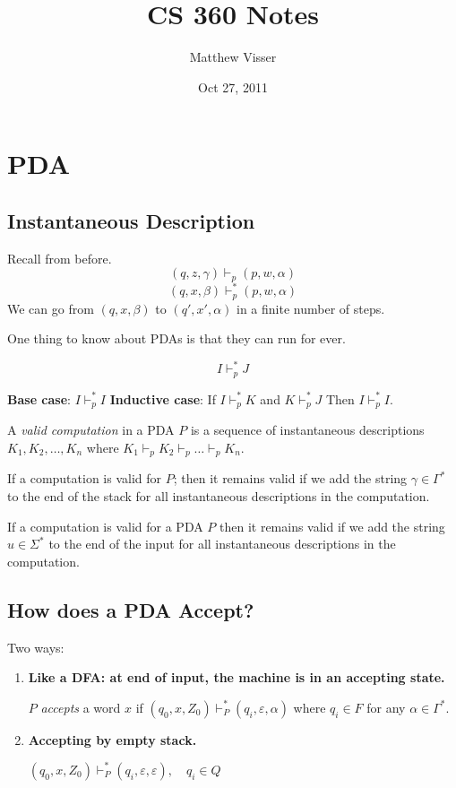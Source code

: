 \documentclass[12pt]{article}
\begin{document}
\title{CS 360 Notes}
\author{Matthew Visser}
\date{Oct 27, 2011}
\maketitle

\section{PDA}

\subsection{Instantaneous Description}

Recall from before.
\[
(q,z,\gamma) \vdash_p (p,w,\alpha)
\]
\[
(q,x,\beta) \vdash_p^* (p,w,\alpha)
\]
We can go from $(q,x,\beta)$ to $(q',x',\alpha)$ in a finite number of steps.

One thing to know about PDAs is that they can run for ever.

\[
I \vdash_p^* J
\]

\textbf{Base case}:  $I \vdash_p^* I$
\textbf{Inductive case}:  If $I \vdash_p^* K$ and $K \vdash_p^* J$ Then $I
\vdash_p^* I$.

A \emph{valid computation} in a PDA $P$ is a sequence of instantaneous
descriptions $K_1, K_2,\dots,K_n$ where $K_1\vdash_p
K_2\vdash_p\dots\vdash_pK_n$.

If a computation is valid for $P$; then it remains valid if we add the string
$\gamma \in \Gamma^*$ to the end of the stack for all instantaneous descriptions
in the computation.

If a computation is valid for a PDA $P$ then it remains valid if we add the
string $u \in \Sigma^*$ to the end of the input for all instantaneous
descriptions in the computation.

\subsection{How does a PDA Accept?}

Two ways:
\begin{enumerate}
	\item \textbf{Like a DFA: at end of input, the machine is in an accepting
		state.}

		$P$ \emph{accepts} a word $x$ if $(q_0,x,Z_0) \vdash_P^*
		(q_i,\varepsilon,\alpha)$ where $q_i \in F$ for any $\alpha \in
		\Gamma^*$.
	\item \textbf{Accepting by empty stack.}

		$(q_0,x,Z_0) \vdash_{P}^{*}(q_i,\varepsilon,\varepsilon),\quad q_i \in
		Q$
\end{enumerate}
\end{document}
